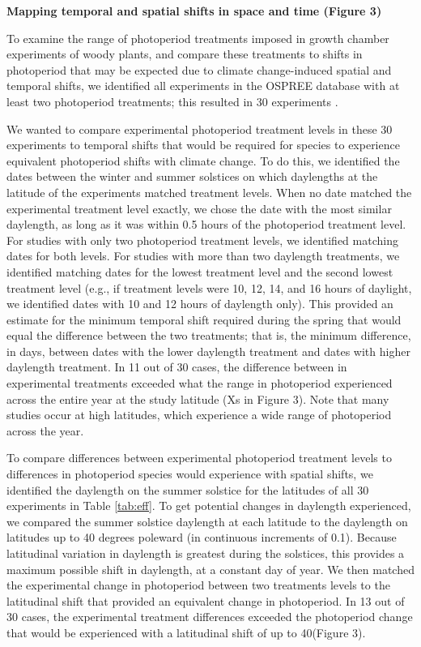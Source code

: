 \documentclass{article}
\begin{document}
\par \textbf{Mapping temporal and spatial shifts in space and time (Figure 3)}
\par To examine the range of photoperiod treatments imposed in growth chamber experiments of woody plants, and compare these treatments to shifts in photoperiod that may be expected due to climate change-induced spatial and temporal shifts, we identified all experiments in the OSPREE database with at least two photoperiod treatments; this resulted in 30 experiments \citep[Table \ref{tab:eff},][]{wolkovich2019}. 
\par We wanted to compare experimental photoperiod treatment levels in these 30 experiments to temporal shifts that would be required for species to experience equivalent photoperiod shifts with climate change. To do this, we identified the dates between the winter and summer solstices on which daylengths at the latitude of the experiments matched treatment levels. When no date matched the experimental treatment level exactly, we chose the date with the most similar daylength, as long as it was within 0.5 hours of the photoperiod treatment level. For studies with only two photoperiod treatment levels, we identified matching dates for both levels. For studies with more than two daylength treatments, we identified matching dates for the lowest treatment level and the second lowest treatment level (e.g., if treatment levels were 10, 12, 14, and 16 hours of daylight, we identified dates with 10 and 12 hours of daylength only). This provided an estimate for the minimum temporal shift required during the spring that would equal the difference between the two treatments; that is, the minimum difference, in days, between dates with the lower daylength treatment and dates with higher daylength treatment.
In 11 out of 30 cases, the difference between in experimental treatments exceeded what the range in photoperiod experienced across the entire year at the study latitude (Xs in Figure 3). Note that many studies occur at high latitudes, which experience a wide range of photoperiod across the year. 

\par To compare differences between experimental photoperiod treatment levels to differences in photoperiod species would experience with spatial shifts, we identified the daylength on the summer solstice for the latitudes of all 30 experiments in Table \ref{tab:eff}. To get potential changes in daylength experienced, we compared the summer solstice daylength at each latitude to the daylength on latitudes up to 40 degrees poleward (in continuous increments of 0.1\degree). Because latitudinal variation in daylength is greatest during the solstices, this provides a maximum possible shift in daylength, at a constant day of year. We then matched the experimental change in photoperiod between two treatments levels to the latitudinal shift that provided an equivalent change in photoperiod. In 13 out of 30 cases, the experimental treatment differences exceeded the photoperiod change that would be experienced with a latitudinal shift of up to 40\degree (Figure 3). 
\end{document}
